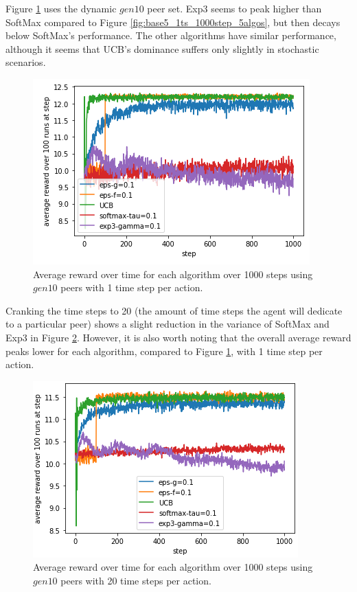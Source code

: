 \documentclass{article}
\begin{document}
Figure \ref{fig:gen10_1ts_1000step_5algos} uses the dynamic $gen10$ peer set. Exp3 seems to peak higher than SoftMax compared to Figure \ref{fig:base5_1ts_1000step_5algos}, 
but then decays below SoftMax's performance. The other algorithms have similar performance, although it seems that UCB's dominance suffers only slightly in stochastic 
scenarios. 
\begin{figure}[h]
    \centering
    \includegraphics[width=1\linewidth]{figs/gen10_1ts_1000step_5algos.png}
    \caption{Average reward over time for each algorithm over 1000 steps using $gen10$ peers with 1 time step per action.}
    \label{fig:gen10_1ts_1000step_5algos}
\end{figure}

Cranking the time steps to 20 (the amount of time steps the agent will dedicate to a particular peer) shows a slight reduction in the variance of SoftMax and Exp3 in 
Figure \ref{fig:gen10_20ts_1000step_5algos}. However, it is also worth noting that the overall average reward peaks lower for each algorithm, compared to 
Figure \ref{fig:gen10_1ts_1000step_5algos}, with 1 time step per action.
\begin{figure}[h]
    \centering
    \includegraphics[width=1\linewidth]{figs/gen10_20ts_1000step_5algos.png}
    \caption{Average reward over time for each algorithm over 1000 steps using $gen10$ peers with 20 time steps per action.}
    \label{fig:gen10_20ts_1000step_5algos}
\end{figure}
\end{document}
